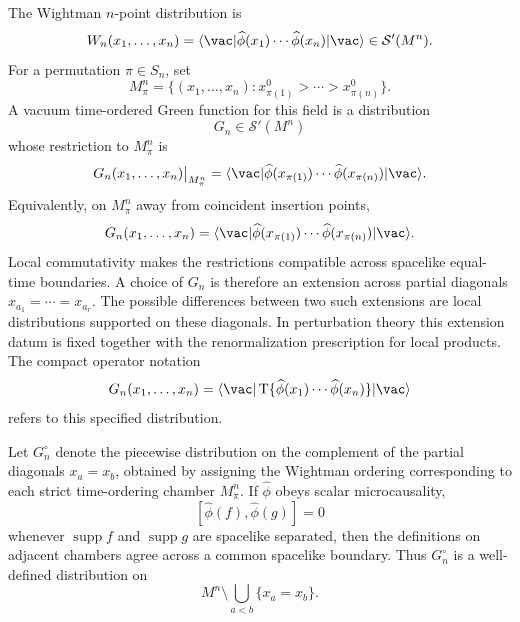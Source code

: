 \begin{definition}
\label{def:wightman-time-ordered-distributions}
The Wightman \(n\)-point distribution is
\[
  W_n(x_1,\ldots,x_n)
  =
  \langle \vac|
  \widehat\phi(x_1)\cdots\widehat\phi(x_n)
  |\vac\rangle
  \in \mathcal S'(M^n).
\]
For a permutation \(\pi\in S_n\), set
\[
  M_\pi^n
  =
  \{(x_1,\ldots,x_n):x_{\pi(1)}^0>\cdots>x_{\pi(n)}^0\}.
\]
A vacuum time-ordered Green function for this field is a distribution
\[
  G_n\in\mathcal S'(M^n)
\]
whose restriction to \(M_\pi^n\) is
\[
  G_n(x_1,\ldots,x_n)\big|_{M_\pi^n}
  =
  \langle \vac|
  \widehat\phi(x_{\pi(1)})\cdots
  \widehat\phi(x_{\pi(n)})
  |\vac\rangle .
\]
Equivalently, on \(M_\pi^n\) away from coincident insertion points,
\[
  G_n(x_1,\ldots,x_n)
  =
  \langle \vac|
  \widehat\phi(x_{\pi(1)})\cdots
  \widehat\phi(x_{\pi(n)})
  |\vac\rangle .
\]
Local commutativity makes the restrictions compatible across spacelike
equal-time boundaries.  A choice of \(G_n\) is therefore an extension across
partial diagonals \(x_{a_1}=\cdots=x_{a_r}\).  The possible differences
between two such extensions are local distributions supported on these
diagonals.  In perturbation theory this extension datum is fixed together
with the renormalization prescription for local products.  The compact
operator notation
\[
  G_n(x_1,\ldots,x_n)
  =
  \langle \vac|
  \operatorname T\{
    \widehat\phi(x_1)\cdots\widehat\phi(x_n)
  \}
  |\vac\rangle
\]
refers to this specified distribution.
\end{definition}

\begin{proposition}
\label{prop:time-ordered-wightman-piece-compatibility}
Let \(G_n^\circ\) denote the piecewise distribution on the complement of the
partial diagonals \(x_a=x_b\), obtained by assigning the Wightman ordering
corresponding to each strict time-ordering chamber \(M_\pi^n\).  If
\(\widehat\phi\) obeys scalar microcausality,
\[
  [\widehat\phi(f),\widehat\phi(g)]=0
\]
whenever \(\operatorname{supp}f\) and \(\operatorname{supp}g\) are spacelike
separated, then the definitions on adjacent chambers agree across a common
spacelike boundary.  Thus \(G_n^\circ\) is a well-defined distribution on
\[
  M^n\setminus \bigcup_{a<b}\{x_a=x_b\}.
\]
\end{proposition}

